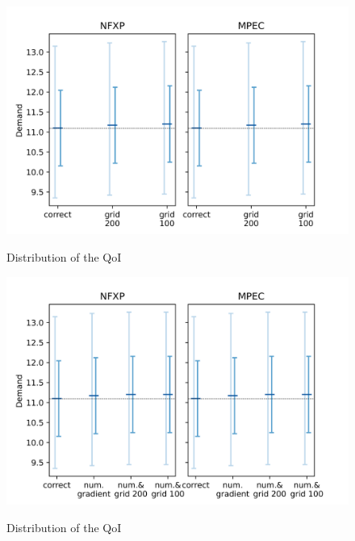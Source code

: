\begin{figure}[H]
	\caption{Distribution of the QoI}
	\vspace*{-4mm}
	\centering
	\includegraphics[scale=0.9]{../figures/figure_7.png}
	\label{figure7}
\end{figure}

\begin{figure}[H]
	\caption{Distribution of the QoI}
	\vspace*{-4mm}
	\centering
	\includegraphics[scale=0.9]{../figures/figure_8.png}
	\label{figure8}
\end{figure}

